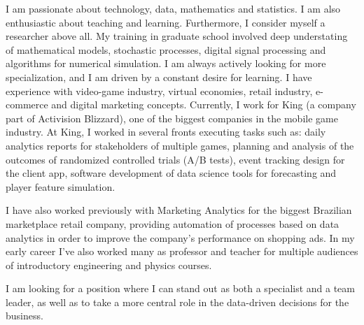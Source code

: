 


I am passionate about technology, data, mathematics and statistics. I am also enthusiastic about teaching and learning.
%
Furthermore, I consider myself a researcher above all. 
My training in graduate school involved deep understating of 
mathematical models, 
stochastic processes, 
digital signal processing and 
algorithms for numerical simulation. 
I am always actively looking for more specialization, and 
I am driven by a constant desire for learning. 
%
I have experience with 
video-game industry, 
virtual economies, 
retail industry, 
e-commerce and 
digital marketing concepts.
%
Currently, I work for 
King (a company part of Activision Blizzard), one of the biggest companies in the mobile game industry. 
%
At King, I worked in several fronts executing tasks such as:
daily analytics reports for stakeholders of multiple games,
planning and analysis of the outcomes of randomized controlled trials  (A/B tests),
event tracking design for the client app,
software development of data science tools for forecasting and player feature simulation.

I have also worked previously with Marketing Analytics for the biggest Brazilian marketplace retail company, providing automation of processes based on data analytics in order to improve the company's performance on shopping ads. In my early career I've also worked many as professor and teacher for multiple audiences of introductory engineering and physics courses.

I am looking for a position where I can stand out as both a specialist and a team leader, as well as to take a more central role in the data-driven decisions for the business. 